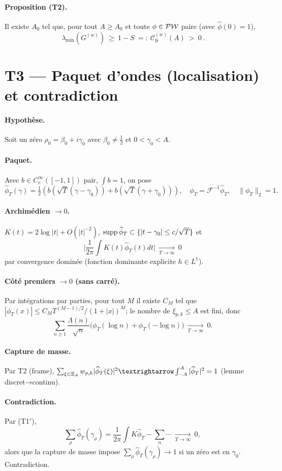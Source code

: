 \documentclass[11pt,a4paper]{proofarticle}
\begin{document}
\paragraph{Proposition (T2).}
Il existe $A_0$ tel que, pour tout $A\ge A_0$ et toute $\phi\in\mathcal{PW}$ paire (avec $\widehat{\phi}(0)=1$),
\[
\boxed{\ \lambda_{\min}(G^{(w)})\ \ge\ 1-S\ =:\ \mathcal{C}_{\mathrm{fr}}^{(w)}(A)\ >\ 0\ }.
\]

\section*{T3 — Paquet d’ondes (localisation) et contradiction}
\paragraph{Hypothèse.} Soit un zéro $\rho_0=\beta_0+i\gamma_0$ avec $\beta_0\ne \frac12$ et $0<\gamma_0<A$.
\paragraph{Paquet.}
Avec $b\in C_c^\infty([-1,1])$ pair, $\int b=1$, on pose
\[
\widehat{\phi}_T(\gamma)=\tfrac12\!\left(b(\sqrt{T}(\gamma-\gamma_0))+b(\sqrt{T}(\gamma+\gamma_0))\right),\quad
\phi_T=\mathcal{F}^{-1}\widehat{\phi}_T,\quad \|\phi_T\|_2=1.
\]
\paragraph{Archimédien $\to 0$.}
$K(t)=2\log|t|+O(|t|^{-2})$, $\operatorname{supp} \widehat{\phi}_T\subset\{|t-\gamma_0|\le c/\sqrt{T}\}$ et
\[
\Big|\frac{1}{2\pi}\int K(t)\widehat{\phi}_T(t)dt\Big|\ \xrightarrow[T\to\infty]{}\ 0
\]
par convergence dominée (fonction dominante explicite $h\in L^1$).
\paragraph{Côté premiers $\to 0$ (sans carré).}
Par intégrations par parties, pour tout $M$ il existe $C_M$ tel que
$|\phi_T(x)|\le C_M T^{(M-1)/2}/(1+|x|)^M$; le nombre de $\xi_{p,k}\le A$ est fini, donc
\[
\sum_{n\ge1}\frac{\Lambda(n)}{\sqrt{n}}\big(\phi_T(\log n)+\phi_T(-\log n)\big)\ \xrightarrow[T\to\infty]{}\ 0.
\]
\paragraph{Capture de masse.}
Par T2 (frame), $\sum_{\xi\in\Xi_A}\wpk|\widehat{\phi}_T(\xi)|^2 \to \int_{-A}^A |\widehat{\phi}_T|^2=1$ (lemme discret→continu).
\paragraph{Contradiction.}
Par (T1$′$),
\[
\sum_{\rho}\widehat{\phi}_T(\gamma_\rho)=\frac{1}{2\pi}\int K\widehat{\phi}_T-\sum_n \cdots\ \xrightarrow[T\to\infty]{}\ 0,
\]
alors que la capture de masse impose $\sum_{\rho}\widehat{\phi}_T(\gamma_\rho)\to 1$ si un zéro est en $\gamma_0$. Contradiction.
\end{document}
